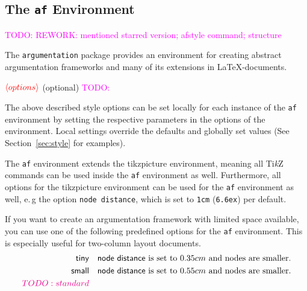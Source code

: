 \documentclass[headings=normal]{scrartcl}
\newcommand{\todo}[1]{\textcolor{magenta}{TODO: #1}} %
\newcommand{\tikzname}{Ti\emph{k}Z\xspace}
\newcommand{\argumentation}{\texttt{argumentation}\xspace}
\newcommand{\opt}[2][red]{\ensuremath{\textcolor{#1}{\langle #2\rangle}}}
\newcommand{\makecmd}[1]{\textbackslash\hspace{-1ex}#1}
\newenvironment{command}[1]{
    \medskip\medskip
    \hspace{-1.5cm}{\ttfamily \makecmd{#1}}
    \begin{description}[labelindent=1.5cm,labelsep=0.5em, align=right]
}{%
    \end{description}
    \medskip
}
\begin{document}
\subsection{The \texttt{af} Environment}\label{sec:af}
\todo{REWORK: mentioned starred version; afstyle command; structure}

The \argumentation package provides an environment for creating abstract argumentation frameworks and many of its extensions in \LaTeX-documents.

\begin{command}{
    begin\{af\}[\opt{options}]\\
        \opt[green]{environment~content}\\
    \textbackslash\hspace{-0.1ex}end\{af\}
}
    \item[\opt{options}] (optional) \todo{}
\end{command}


    The above described style options can be set locally for each instance of the \texttt{af} environment by setting the respective parameters in the options of the environment.
    Local settings override the defaults and globally set values (See Section~\ref{sec:style} for examples).
    
    The \texttt{af} environment extends the \textsf{tikzpicture} environment, meaning all \tikzname commands can be used inside the \texttt{af} environment as well.
    Furthermore, all options for the \textsf{tikzpicture} environment can be used for the \texttt{af} environment as well, e.\,g the option \verb|node distance|, which is set to \verb|1cm| (\verb|6.6ex|) per default.

    If you want to create an argumentation framework with limited space available, you can use one of the following predefined options for the \texttt{af} environment. 
    This is especially useful for two-column layout documents.
    \begin{align*}
        \mathsf{tiny} &\quad \text{\textsf{node distance} is set to $0.35cm$ and nodes are smaller.}\\
        \mathsf{small} &\quad \text{\textsf{node distance} is set to $0.55cm$ and nodes are smaller.}\\
        \todo{standard}&
    \end{align*}
\end{document}
